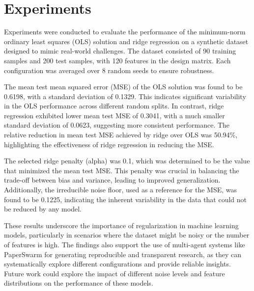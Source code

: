 \section{Experiments}

Experiments were conducted to evaluate the performance of the minimum-norm ordinary least squares (OLS) solution and ridge regression on a synthetic dataset designed to mimic real-world challenges. The dataset consisted of 90 training samples and 200 test samples, with 120 features in the design matrix. Each configuration was averaged over 8 random seeds to ensure robustness. 

The mean test mean squared error (MSE) of the OLS solution was found to be 0.6198, with a standard deviation of 0.1329. This indicates significant variability in the OLS performance across different random splits. In contrast, ridge regression exhibited lower mean test MSE of 0.3041, with a much smaller standard deviation of 0.0623, suggesting more consistent performance. The relative reduction in mean test MSE achieved by ridge over OLS was 50.94\%, highlighting the effectiveness of ridge regression in reducing the MSE.

The selected ridge penalty (alpha) was 0.1, which was determined to be the value that minimized the mean test MSE. This penalty was crucial in balancing the trade-off between bias and variance, leading to improved generalization. Additionally, the irreducible noise floor, used as a reference for the MSE, was found to be 0.1225, indicating the inherent variability in the data that could not be reduced by any model.

These results underscore the importance of regularization in machine learning models, particularly in scenarios where the dataset might be noisy or the number of features is high. The findings also support the use of multi-agent systems like PaperSwarm for generating reproducible and transparent research, as they can systematically explore different configurations and provide reliable insights. Future work could explore the impact of different noise levels and feature distributions on the performance of these models.
